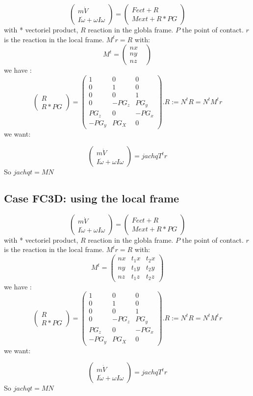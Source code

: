 \[\left(\begin{array}{c}m \dot V\\I \dot \omega + \omega I \omega \end{array}\right)= \left(\begin{array}{c}Fect+R\\Mext + R*PG \end{array}\right)\]
  with * vectoriel product, $R$ reaction in the globla frame. $P$ the point of contact.
  $r$ is the reaction in the local frame.  $M^t r=R$ with:
  \[M^t=\left(\begin{array}{c} nx& \\ny\\nz \end{array}\right)\]
  we have :
  \[\left(\begin{array}{c}R\\R*PG\end{array}\right)=\left(\begin{array}{ccc} 1&0&0\\0&1&0\\0&0&1\\
      0&-PG_z&PG_y\\PG_z&0&-PG_x\\-PG_y&PG_X&0\end{array}\right).R:=N^tR=N^tM^tr\]
      we want:
      
\[\left(\begin{array}{c}m \dot V\\I \dot \omega + \omega I \omega \end{array}\right)=jachqT^t r\]
So $jachqt=MN$

\subsection{Case FC3D: using the local frame}

\[\left(\begin{array}{c}m \dot V\\I \dot \omega + \omega I \omega \end{array}\right)= \left(\begin{array}{c}Fect+R\\Mext + R*PG \end{array}\right)\]
  with * vectoriel product, $R$ reaction in the globla frame. $P$ the point of contact.
  $r$ is the reaction in the local frame.  $M^t r=R$ with:
  \[M^t=\left(\begin{array}{ccc} nx&t_1x&t_2x \\ny&t_1y&t_2y\\nz&t_1z&t_2z \end{array}\right)\]
  we have :
  \[\left(\begin{array}{c}R\\R*PG\end{array}\right)=\left(\begin{array}{ccc} 1&0&0\\0&1&0\\0&0&1\\
      0&-PG_z&PG_y\\PG_z&0&-PG_x\\-PG_y&PG_X&0\end{array}\right).R:=N^tR=N^tM^tr\]
      we want:
      
\[\left(\begin{array}{c}m \dot V\\I \dot \omega + \omega I \omega \end{array}\right)=jachqT^t r\]
So $jachqt=MN$

